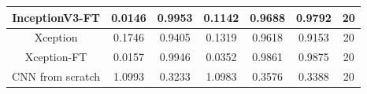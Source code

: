 \documentclass[11pt,a4paper]{article}
\theoremstyle{definition}
\begin{document}
\begin{table}[H]
\begin{tabular}{|c|c|c|c|c|c|c|}
\hline
InceptionV3-FT                                      & \textcolor[rgb]{0.129,0.129,0.129}{0.0146 } & \textcolor[rgb]{0.129,0.129,0.129}{0.9953 } & \textcolor[rgb]{0.129,0.129,0.129}{0.1142 }                                                                       & \textcolor[rgb]{0.129,0.129,0.129}{0.9688}                                                                             & \textcolor[rgb]{0.129,0.129,0.129}{0.9792}                                                                       & 20                                                                                                              \\
\hline
Xception                                            & \textcolor[rgb]{0.129,0.129,0.129}{0.1746 } & \textcolor[rgb]{0.129,0.129,0.129}{0.9405 } & \textcolor[rgb]{0.129,0.129,0.129}{0.1319 }                                                                       & \textcolor[rgb]{0.129,0.129,0.129}{0.9618}                                                                             & \textcolor[rgb]{0.129,0.129,0.129}{0.9153}                                                                       & 20                                                                                                              \\
\hline
Xception-FT                        & \textcolor[rgb]{0.129,0.129,0.129}{0.0157 } & \textcolor[rgb]{0.129,0.129,0.129}{0.9946 } & \textcolor[rgb]{0.129,0.129,0.129}{0.0352 }                                                                       & \textcolor[rgb]{0.129,0.129,0.129}{0.9861}                                                                             & \textcolor[rgb]{0.129,0.129,0.129}{0.9875}                                                                       & 20                                                                                                              \\
\hline
\rowcolor{green} CNN from scratch                        & \textcolor[rgb]{0.129,0.129,0.129}{1.0993  } & \textcolor[rgb]{0.129,0.129,0.129}{0.3233  } & \textcolor[rgb]{0.129,0.129,0.129}{1.0983 }                                                                       & \textcolor[rgb]{0.129,0.129,0.129}{0.3576}                                                                             & \textcolor[rgb]{0.129,0.129,0.129}{0.3388}                                                                       & 20                                                                                                              \\
\hline

\end{tabular}
\end{table}
\end{document}
